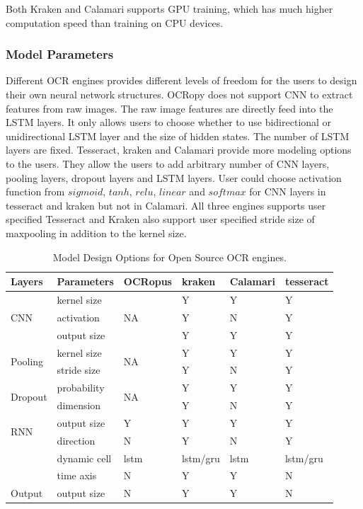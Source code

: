 \documentclass[conference]{IEEEtran}
\begin{document}
Both Kraken and Calamari supports GPU training, which has much higher computation speed than training on CPU devices. 

\subsubsection*{Model Parameters}

Different OCR engines provides different levels of freedom for the users to    
design their own neural network structures. OCRopy does not support CNN to     
extract features from raw images. The raw image features are directly feed into
the LSTM layers. It only allows users to choose whether to use bidirectional or
unidirectional LSTM layer and the size of hidden states. The number of LSTM    
layers are fixed. Tesseract, kraken and Calamari provide more modeling options
to the users. They allow the users to add arbitrary number of CNN layers,
pooling layers, dropout layers and LSTM layers. User could choose activation
function from $sigmoid$, $tanh$, $relu$, $linear$ and $softmax$ for CNN layers
in tesseract and kraken but not in Calamari. All three engines supports user
specified  Tesseract and Kraken also support user specified stride size of
maxpooling in addition to the kernel size.

\begin{table}[bt]
\begin{tabular}{llllll}
\hline
Layers   &Parameters & OCRopus     & kraken                      & Calamari & tesseract\\ \hline
\multirow{ 3}{*}{CNN} & kernel size & \multirow{ 3}{*}{NA} & Y & Y & Y  \\
& activation &  & Y & N & Y \\
& output size & & Y & Y &  Y\\\hline
\multirow{2}{*}{Pooling} &kernel size & \multirow{2}{*}{NA} &  Y & Y & Y \\
& stride size &  & Y & N & Y \\\hline
\multirow{2}{*}{Dropout} &probability & \multirow{2}{*}{NA} &  Y & Y & Y\\
&dimension &  & Y & N & Y \\\hline
\multirow{2}{*}{RNN} & output size & Y &  Y & Y & Y\\
& direction & N & Y & N & Y \\
& dynamic cell & lstm & lstm/gru & lstm & lstm/gru\\
& time axis& N & Y & Y & N \\\hline
Output & output size& N & Y & Y & N \\\hline
\end{tabular}
\caption{Model Design Options for Open Source OCR engines.}
\label{tab:model_param1}
\end{table}
\end{document}
